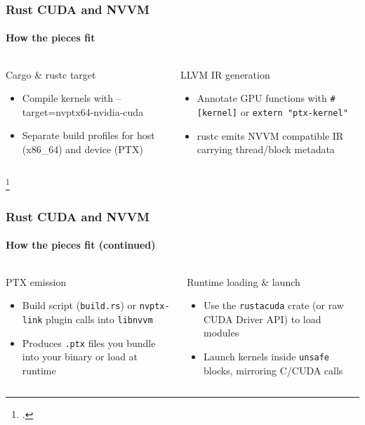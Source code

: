 \documentclass[aspectratio=169]{beamer}
\begin{document}
\begin{frame}
	\frametitle{Rust CUDA and NVVM}
	\framesubtitle{How the pieces fit}

	\begin{columns}[T]
		\begin{column}{0.4\textwidth}
			Cargo \& rustc target \footnotemark
			\begin{itemize}
				\item Compile kernels with --target=nvptx64-nvidia-cuda
				\item Separate build profiles for host (x86\_64) and device (PTX)
			\end{itemize}
		\end{column}
		\begin{column}{0.4\textwidth}
			LLVM IR generation
			\begin{itemize}
				\item Annotate GPU functions with \texttt{\#[kernel]} or \texttt{extern "ptx-kernel"}
				\item rustc emits NVVM compatible IR carrying thread/block metadata
			\end{itemize}
		\end{column}
	\end{columns}
	\footcitetext{rust-for-gpu}
\end{frame}

\begin{frame}
	\frametitle{Rust CUDA and NVVM}
	\framesubtitle{How the pieces fit (continued)}

	\begin{columns}[T]
		\begin{column}{0.4\textwidth}
			PTX emission
			\begin{itemize}
				\item Build script (\texttt{build.rs}) or \Verb|nvptx-link| plugin calls into \Verb|libnvvm|
				\item Produces \Verb|.ptx| files you bundle into your binary or load at runtime
			\end{itemize}
		\end{column}
		\begin{column}{0.4\textwidth}
			Runtime loading \& launch
			\begin{itemize}
				\item Use the \Verb|rustacuda| crate (or raw CUDA Driver API) to load modules
				\item Launch kernels inside \Verb|unsafe| blocks, mirroring C/CUDA calls
			\end{itemize}
		\end{column}
	\end{columns}
\end{frame}
\end{document}
